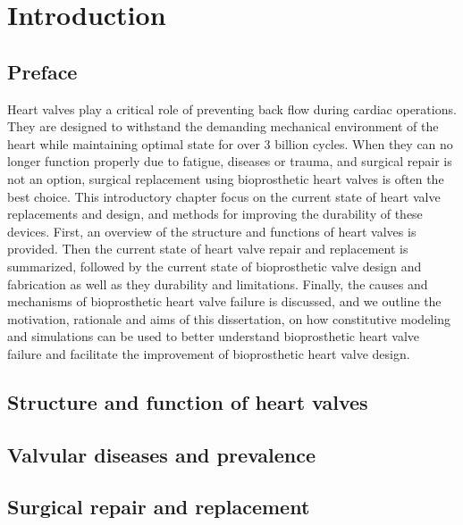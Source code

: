 \chapter{Introduction} %

\section*{Preface}
%

    Heart valves play a critical role of preventing back flow during cardiac operations. They are designed to withstand the demanding mechanical environment of the heart while maintaining optimal state for over 3 billion cycles. When they can no longer function properly due to fatigue, diseases or trauma, and surgical repair is not an option, surgical replacement using bioprosthetic heart valves is often the best choice. This introductory chapter focus on the current state of heart valve replacements and design, and methods for improving the durability of these devices. First, an overview of the structure and functions of heart valves is provided. Then the current state of heart valve repair and replacement is summarized, followed by the current state of bioprosthetic valve design and fabrication as well as they durability and limitations. Finally, the causes and mechanisms of bioprosthetic heart valve failure is discussed, and we outline the motivation, rationale and aims of this dissertation, on how constitutive modeling and simulations can be used to better understand bioprosthetic heart valve failure and facilitate the improvement of bioprosthetic heart valve design. 




\section{Structure and function of heart valves}


\section{Valvular diseases and prevalence}


\section{Surgical repair and replacement}


